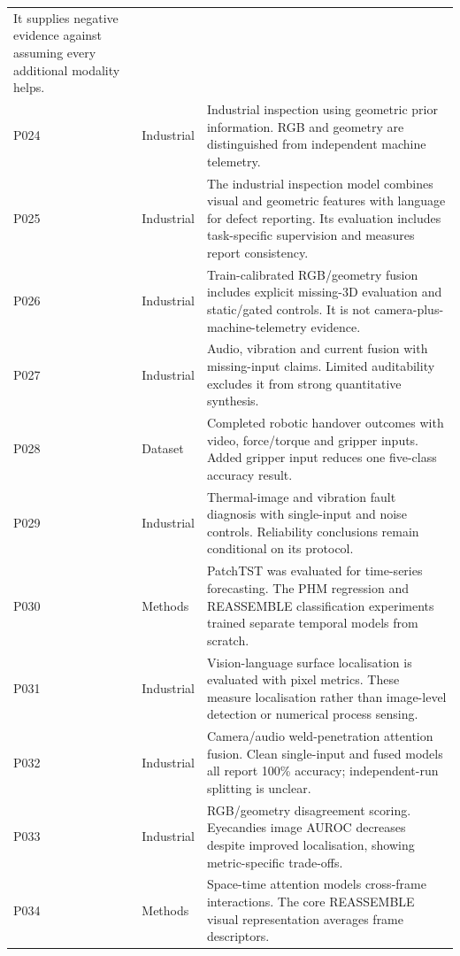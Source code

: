 \begin{longtable}{@{}P{.25\textwidth}P{.16\textwidth}P{.53\textwidth}@{}}
It supplies negative evidence against assuming every additional modality helps. \\
P024 \parencite{P024} & Industrial & Industrial inspection using geometric prior
information. RGB and geometry are distinguished from independent machine telemetry. \\
P025 \parencite{P025} & Industrial & The industrial inspection model combines visual and
geometric features with language for defect reporting. Its evaluation includes
task-specific supervision and measures report consistency. \\
P026 \parencite{P026} & Industrial & Train-calibrated RGB/geometry fusion includes explicit
missing-3D evaluation and static/gated controls. It is not camera-plus-machine-telemetry
evidence. \\
P027 \parencite{P027} & Industrial & Audio, vibration and current fusion with missing-input
claims. Limited auditability excludes it from strong quantitative synthesis. \\
P028 \parencite{Thoduka2024Handover} & Dataset & Completed robotic handover outcomes with
video, force/torque and gripper inputs. Added gripper input reduces one five-class
accuracy result. \\
P029 \parencite{Huo2022Multisensor} & Industrial & Thermal-image and vibration fault
diagnosis with single-input and noise controls. Reliability conclusions remain
conditional on its protocol. \\
P030 \parencite{Nie2023PatchTST} & Methods & PatchTST was evaluated for time-series
forecasting. The PHM regression and REASSEMBLE classification experiments trained
separate temporal models from scratch. \\
P031 \parencite{P031} & Industrial & Vision-language surface localisation is evaluated with
pixel metrics. These measure localisation rather than image-level detection or numerical
process sensing. \\
P032 \parencite{Hua2026Weld} & Industrial & Camera/audio weld-penetration attention fusion.
Clean single-input and fused models all report 100\% accuracy; independent-run splitting
is unclear. \\
P033 \parencite{P033} & Industrial & RGB/geometry disagreement scoring. Eyecandies image
AUROC decreases despite improved localisation, showing metric-specific trade-offs. \\
P034 \parencite{P034} & Methods & Space-time attention models cross-frame interactions. The
core REASSEMBLE visual representation averages frame descriptors. \\

\end{longtable}
